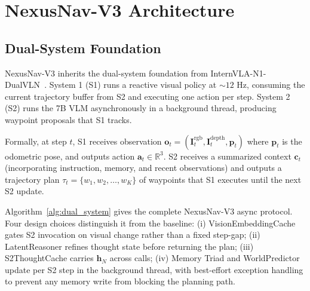 \documentclass[10pt,twocolumn,letterpaper]{article}
\begin{document}
\section{NexusNav-V3 Architecture}

\subsection{Dual-System Foundation}

NexusNav-V3 inherits the dual-system foundation from InternVLA-N1-DualVLN~\cite{internvla2024}. System 1 (S1) runs a reactive visual policy at ${\sim}12$ Hz, consuming the current trajectory buffer from S2 and executing one action per step. System 2 (S2) runs the 7B VLM asynchronously in a background thread, producing waypoint proposals that S1 tracks.

Formally, at step $t$, S1 receives observation $\mathbf{o}_t = (\mathbf{I}_t^{\text{rgb}}, \mathbf{I}_t^{\text{depth}}, \mathbf{p}_t)$ where $\mathbf{p}_t$ is the odometric pose, and outputs action $\mathbf{a}_t \in \mathbb{R}^3$. S2 receives a summarized context $\mathbf{c}_t$ (incorporating instruction, memory, and recent observations) and outputs a trajectory plan $\tau_t = \{w_1, w_2, \ldots, w_K\}$ of waypoints that S1 executes until the next S2 update.

Algorithm~\ref{alg:dual_system} gives the complete NexusNav-V3 async protocol. Four design choices distinguish it from the baseline: (i) VisionEmbeddingCache gates S2 invocation on visual change rather than a fixed step-gap; (ii) LatentReasoner refines thought state before returning the plan; (iii) S2ThoughtCache carries $\mathbf{h}_N$ across calls; (iv) Memory Triad and WorldPredictor update per S2 step in the background thread, with best-effort exception handling to prevent any memory write from blocking the planning path.
\end{document}
